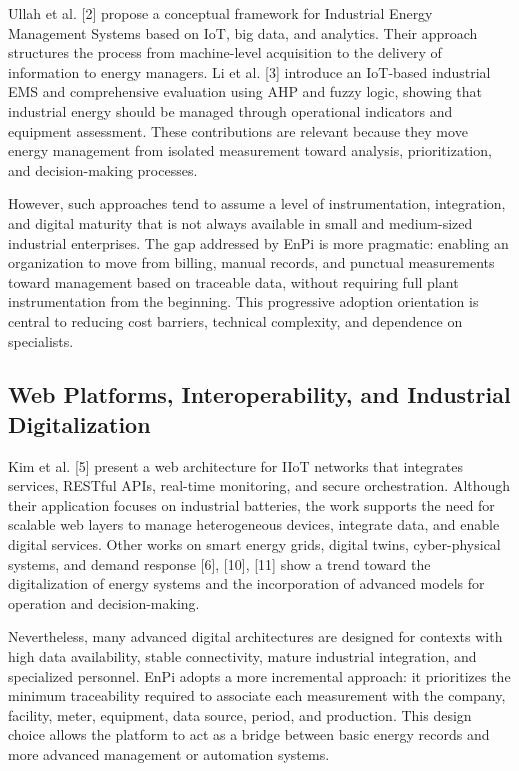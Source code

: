 \documentclass{ieeeaccess}
\begin{document}
Ullah et al. [2] propose a conceptual framework for Industrial Energy Management Systems based on IoT, big data, and analytics. Their approach structures the process from machine-level acquisition to the delivery of information to energy managers. Li et al. [3] introduce an IoT-based industrial EMS and comprehensive evaluation using AHP and fuzzy logic, showing that industrial energy should be managed through operational indicators and equipment assessment. These contributions are relevant because they move energy management from isolated measurement toward analysis, prioritization, and decision-making processes.

However, such approaches tend to assume a level of instrumentation, integration, and digital maturity that is not always available in small and medium-sized industrial enterprises. The gap addressed by EnPi is more pragmatic: enabling an organization to move from billing, manual records, and punctual measurements toward management based on traceable data, without requiring full plant instrumentation from the beginning. This progressive adoption orientation is central to reducing cost barriers, technical complexity, and dependence on specialists.

\subsection{Web Platforms, Interoperability, and Industrial Digitalization}
\label{subsec:web-platforms}

Kim et al. [5] present a web architecture for IIoT networks that integrates services, RESTful APIs, real-time monitoring, and secure orchestration. Although their application focuses on industrial batteries, the work supports the need for scalable web layers to manage heterogeneous devices, integrate data, and enable digital services. Other works on smart energy grids, digital twins, cyber-physical systems, and demand response [6], [10], [11] show a trend toward the digitalization of energy systems and the incorporation of advanced models for operation and decision-making.

Nevertheless, many advanced digital architectures are designed for contexts with high data availability, stable connectivity, mature industrial integration, and specialized personnel. EnPi adopts a more incremental approach: it prioritizes the minimum traceability required to associate each measurement with the company, facility, meter, equipment, data source, period, and production. This design choice allows the platform to act as a bridge between basic energy records and more advanced management or automation systems.
\end{document}
